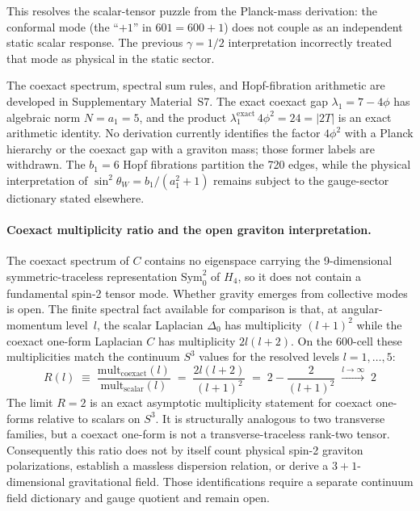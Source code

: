 \documentclass[12pt,a4paper]{article}
\theoremstyle{definition}
\begin{document}
This resolves the scalar-tensor puzzle from the Planck-mass derivation: the
conformal mode (the ``$+1$'' in $601 = 600 + 1$) does not couple as an
independent static scalar response.  The previous $\gamma = 1/2$ interpretation
incorrectly treated that mode as physical in the static sector.

The coexact spectrum, spectral sum rules, and Hopf-fibration arithmetic are developed in Supplementary Material~S7.  The exact coexact gap $\lambda_1=7-4\phi$ has algebraic norm $N=a_1=5$, and the product $\lambda_1^{\mathrm{exact}}\,4\phi^2=24=|2T|$ is an exact arithmetic identity.  No derivation currently identifies the factor $4\phi^2$ with a Planck hierarchy or the coexact gap with a graviton mass; those former labels are withdrawn.  The $b_1=6$ Hopf fibrations partition the 720 edges, while the physical interpretation of $\sin^2\theta_W=b_1/(a_1^2+1)$ remains subject to the gauge-sector dictionary stated elsewhere.

\paragraph{Coexact multiplicity ratio and the open graviton interpretation.}
The coexact spectrum of $C$ contains no eigenspace carrying the 9-dimensional symmetric-traceless representation $\mathrm{Sym}^2_0$ of $H_4$, so it does not contain a fundamental spin-2 tensor mode.  Whether gravity emerges from collective modes is open.  The finite spectral fact available for comparison is that, at angular-momentum level~$l$, the scalar Laplacian $\Delta_0$ has multiplicity $(l+1)^2$ while the coexact one-form Laplacian $C$ has multiplicity $2l(l+2)$.  On the 600-cell these multiplicities match the continuum $S^3$ values for the resolved levels $l=1,\ldots,5$:
\begin{equation}
R(l) \;\equiv\; \frac{\mathrm{mult}_{\mathrm{coexact}}(l)}{\mathrm{mult}_{\mathrm{scalar}}(l)} \;=\; \frac{2l(l+2)}{(l+1)^2} \;=\; 2 - \frac{2}{(l+1)^2} \;\xrightarrow{l\to\infty}\; 2
\label{eq:polarization_ratio}
\end{equation}
The limit $R=2$ is an exact asymptotic multiplicity statement for coexact one-forms relative to scalars on $S^3$.  It is structurally analogous to two transverse families, but a coexact one-form is not a transverse-traceless rank-two tensor.  Consequently this ratio does not by itself count physical spin-2 graviton polarizations, establish a massless dispersion relation, or derive a $3+1$-dimensional gravitational field.  Those identifications require a separate continuum field dictionary and gauge quotient and remain open.
\end{document}
